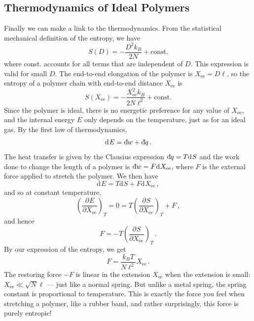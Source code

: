 \documentclass{article}
\theoremstyle{plain}\theoremheaderfont{\normalfont\bfseries}\theorembodyfont{\rmfamily}\theoremseparator{.}\newtheorem*{thm}{Theorem}\newtheorem*{law}{Law}\newtheorem*{pos}{Postulate}
\numberwithin{equation}{section}
\newcommand{\dbar}{\mathrm{d}\hspace*{-0.14em}\bar{}\hspace*{0.12em}}
\renewcommand{\d}[2][]{\mathrm{d}^{#1} #2}
\newcommand{\pdv}[3][]{\frac{\partial^{#1} #2}{{\partial #3}^{#1}}}
\begin{document}
    \subsection{Thermodynamics of Ideal Polymers}
    Finally we can make a link to the thermodynamics. From the statistical mechanical definition of the entropy, we have
    \begin{equation}
        S(D)=-\frac{D^2 k_B}{2N}+\text{const.}
    \end{equation}
    where const. accounts for all terms that are independent of \(D\). This expression is valid for small \(D\). The end-to-end elongation of the polymer is \(X_{\text{ee}}=D\ell\), so the entropy of a polymer chain with end-to-end distance \(X_{\text{ee}}\) is
    \begin{equation}
        S(X_{\text{ee}})=-\frac{X_{\text{ee}}^2 k_B}{2N\ell^2}+\text{const.}
    \end{equation}
    Since the polymer is ideal, there is no energetic preference for any value of \(X_{\text{ee}}\), and the internal energy \(E\) only depends on the temperature, just as for an ideal gas. By the first law of thermodynamics,
    \begin{equation}
        \d{E}=\dbar w+\dbar q\,.
    \end{equation}
    The heat transfer is given by the Clausius expression \(\dbar q=T\d{S}\) and the work done to change the length of a polymer is \(\dbar w=F\d{X_{\text{ee}}}\), where \(F\) is the external force applied to stretch the polymer. We then have
    \begin{equation}
        \d{E}=T\d{S}+F\d{X_{\text{ee}}}\,,
    \end{equation}
    and so at constant temperature,
    \begin{equation}
        \left(\pdv{E}{X_{\text{ee}}}\right)_T=0=T\left(\pdv{S}{X_{\text{ee}}}\right)_T + F\,,
    \end{equation}
    and hence
    \begin{equation}
        F=-T\left(\pdv{S}{X_{\text{ee}}}\right)_T\,.
    \end{equation}
    By our expression of the entropy, we get
    \begin{equation}\label{polymer_force}
        F=\frac{k_B T}{N\ell^2}X_{\text{ee}}\,.
    \end{equation}
    The restoring force \(-F\) is linear in the extension \(X_{\text{ee}}\) when the extension is small: \(X_{\text{ee}}\ll\sqrt{N}\ell\) --- just like a normal spring. But unlike a metal spring, the spring constant is proportional to temperature. This is exactly the force you feel when stretching a polymer, like a rubber band, and rather surprisingly, this force is purely entropic!
\end{document}
